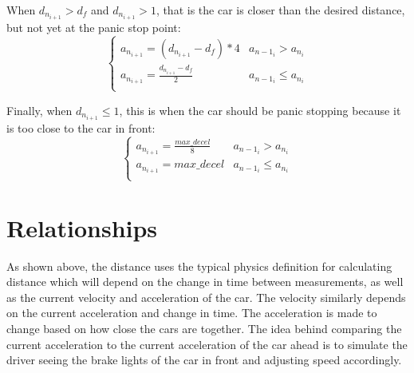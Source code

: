 \documentclass[12pt]{extarticle}
\begin{document}
When $d_{n_{i+1}} > d_f$ and $d_{n_{i+1}} > 1$, that is the car is closer than the desired distance, but not yet at the panic stop point:
\[ \begin{cases} 
      a_{n_{i+1}} = (d_{n_{i+1}} - d_f) * 4 & a_{{n-1}_i} > a_{n_i}\\
      a_{n_{i+1}} = \frac{d_{n_{i+1}} - d_f}{2} & a_{{n-1}_i} \leq a_{n_i}\\
   \end{cases}
\]

Finally, when $d_{n_{i+1}} \leq 1$, this is when the car should be panic stopping because it is too close to the car in front:
\[ \begin{cases} 
      a_{n_{i+1}} = \frac{max\_decel}{8} & a_{{n-1}_i} > a_{n_i}\\
      a_{n_{i+1}} = max\_decel & a_{{n-1}_i} \leq a_{n_i}\\
   \end{cases}
\]

\section{Relationships}
As shown above, the distance uses the typical physics definition for calculating distance which will depend on the change in time between measurements, as well as the current velocity and acceleration of the car. The velocity similarly depends on the current acceleration and change in time. The acceleration is made to change based on how close the cars are together. The idea behind comparing the current acceleration to the current acceleration of the car ahead is to simulate the driver seeing the brake lights of the car in front and adjusting speed accordingly. 
\end{document}
